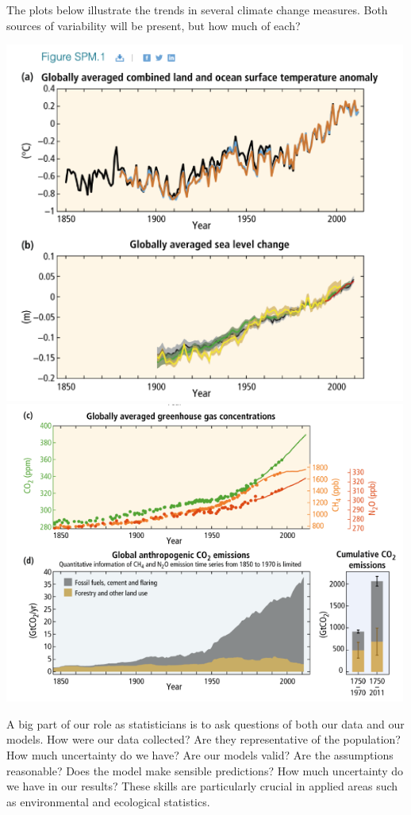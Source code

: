 \documentclass[
  letterpaper,
  DIV=11,
  numbers=noendperiod]{scrartcl}
\begin{document}
The plots below illustrate the trends in several climate change
measures. Both sources of variability will be present, but how much of
each?

\includegraphics[width=5.20833in,height=\textheight]{images/TempAndSea.png}
\includegraphics[width=5.20833in,height=\textheight]{images/GreenhouseCO2.png}

A big part of our role as statisticians is to ask questions of both our
data and our models. How were our data collected? Are they
representative of the population? How much uncertainty do we have? Are
our models valid? Are the assumptions reasonable? Does the model make
sensible predictions? How much uncertainty do we have in our results?
These skills are particularly crucial in applied areas such as
environmental and ecological statistics.
\end{document}
